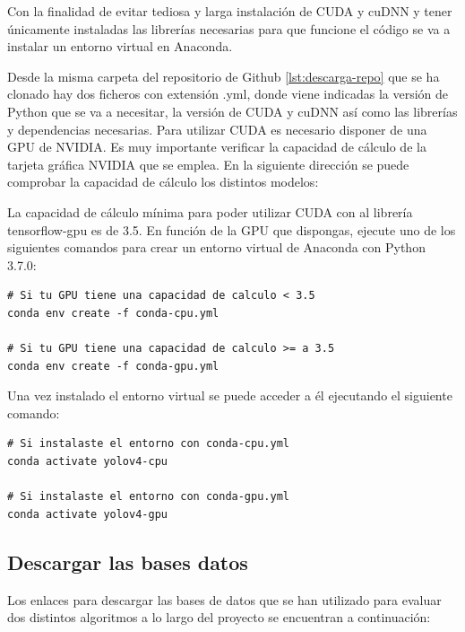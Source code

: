 Con la finalidad de evitar tediosa y larga instalación de CUDA y cuDNN y tener únicamente instaladas las librerías necesarias para que funcione el código se va a instalar un entorno virtual en Anaconda.

Desde la misma carpeta del repositorio de Github \ref{lst:descarga-repo} que se ha clonado hay dos ficheros con extensión .yml, donde viene indicadas la versión de Python que se va a necesitar, la versión de CUDA y cuDNN así como las librerías y dependencias necesarias. Para utilizar CUDA es necesario disponer de una GPU de NVIDIA. Es muy importante verificar la capacidad de cálculo de la tarjeta gráfica NVIDIA que se emplea. En la siguiente dirección \cite{cuda-gpus} se puede comprobar la capacidad de cálculo los distintos modelos:

La capacidad de cálculo mínima para poder utilizar CUDA con al librería tensorflow-gpu es de 3.5. En función de la GPU que dispongas, ejecute uno de los siguientes comandos para crear un entorno virtual de Anaconda con Python 3.7.0:

\vspace{0.5cm}
\begin{lstlisting}[language=iPython,caption=Creación entorno virtual en Anaconda,captionpos=b,label={lst:crear-env}]
# Si tu GPU tiene una capacidad de calculo < 3.5
conda env create -f conda-cpu.yml

# Si tu GPU tiene una capacidad de calculo >= a 3.5
conda env create -f conda-gpu.yml
\end{lstlisting}

Una vez instalado el entorno virtual se puede acceder a él ejecutando el siguiente comando:
\vspace{0.5cm}
\begin{lstlisting}[language=iPython,caption=Activar entorno virtual de Anaconda,captionpos=b,label={lst:activar-env}]
# Si instalaste el entorno con conda-cpu.yml
conda activate yolov4-cpu

# Si instalaste el entorno con conda-gpu.yml
conda activate yolov4-gpu
\end{lstlisting}

\subsection{Descargar las bases datos}
\label{subsec:descarga-datasets}

Los enlaces para descargar las bases de datos que se han utilizado para evaluar dos distintos algoritmos a lo largo del proyecto se encuentran a continuación:

